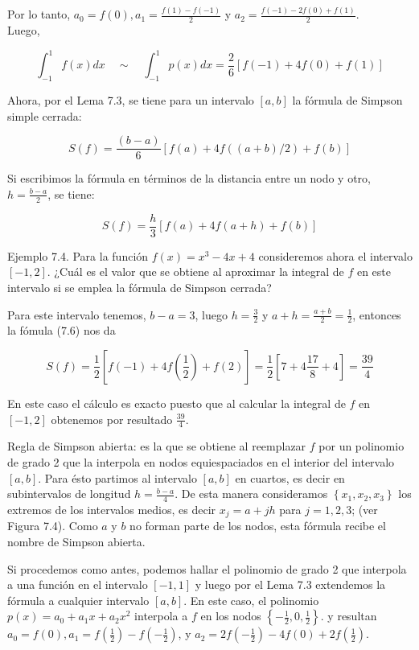 \documentclass[10pt]{book}
\begin{document}
Por lo tanto, $a_{0}=f(0), a_{1}=\frac{f(1)-f(-1)}{2}$ y $a_{2}=\frac{f(-1)-2 f(0)+f(1)}{2}$.\\
Luego,

$$
\int_{-1}^{1} f(x) d x \quad \sim \quad \int_{-1}^{1} p(x) d x=\frac{2}{6}[f(-1)+4 f(0)+f(1)]
$$

Ahora, por el Lema 7.3, se tiene para un intervalo $[a, b]$ la fórmula de Simpson simple cerrada:

$$
S(f)=\frac{(b-a)}{6}[f(a)+4 f((a+b) / 2)+f(b)]
$$

Si escribimos la fórmula en términos de la distancia entre un nodo y otro, $h=\frac{b-a}{2}$, se tiene:


\begin{equation*}
S(f)=\frac{h}{3}[f(a)+4 f(a+h)+f(b)] \tag{7.6}
\end{equation*}


Ejemplo 7.4. Para la función $f(x)=x^{3}-4 x+4$ consideremos ahora el intervalo $[-1,2]$. ¿Cuál es el valor que se obtiene al aproximar la integral de $f$ en este intervalo si se emplea la fórmula de Simpson cerrada?

Para este intervalo tenemos, $b-a=3$, luego $h=\frac{3}{2}$ y $a+h=\frac{a+b}{2}=\frac{1}{2}$, entonces la fómula (7.6) nos da

$$
S(f)=\frac{1}{2}\left[f(-1)+4 f\left(\frac{1}{2}\right)+f(2)\right]=\frac{1}{2}\left[7+4 \frac{17}{8}+4\right]=\frac{39}{4}
$$

En este caso el cálculo es exacto puesto que al calcular la integral de $f$ en $[-1,2]$ obtenemos por resultado $\frac{39}{4}$.

Regla de Simpson abierta: es la que se obtiene al reemplazar $f$ por un polinomio de grado 2 que la interpola en nodos equiespaciados en el interior del intervalo $[a, b]$. Para ésto partimos al intervalo $[a, b]$ en cuartos, es decir en subintervalos de longitud $h=\frac{b-a}{4}$. De esta manera consideramos $\left\{x_{1}, x_{2}, x_{3}\right\}$ los extremos de los intervalos medios, es decir $x_{j}=a+j h$ para $j=1,2,3$; (ver Figura 7.4). Como $a$ y $b$ no forman parte de los nodos, esta fórmula recibe el nombre de Simpson abierta.

Si procedemos como antes, podemos hallar el polinomio de grado 2 que interpola a una función en el intervalo $[-1,1]$ y luego por el Lema 7.3 extendemos la fórmula a cualquier intervalo $[a, b]$. En este caso, el polinomio $p(x)=a_{0}+a_{1} x+a_{2} x^{2}$ interpola a $f$ en los nodos $\left\{-\frac{1}{2}, 0, \frac{1}{2}\right\}$. y resultan $a_{0}=f(0), a_{1}=f\left(\frac{1}{2}\right)-f\left(-\frac{1}{2}\right)$, y $a_{2}=2 f\left(-\frac{1}{2}\right)-4 f(0)+2 f\left(\frac{1}{2}\right)$.
\end{document}
